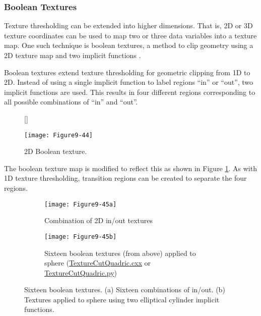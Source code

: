 \subsubsection{Boolean Textures}

Texture thresholding can be extended into higher dimensions. That is, 2D or 3D texture coordinates can be used to map two or three data variables into a texture map. One such technique is boolean textures, a method to clip geometry using a 2D texture map and two implicit functions \cite{Lorensen93}.

Boolean textures extend texture thresholding for geometric clipping from 1D to 2D. Instead of using a single implicit function to label regions ``in'' or ``out'', two implicit functions are used. This results in four different regions corresponding to all possible combinations of ``in'' and ``out''.

\begin{figure}[!htb]
	[\FBwidth]
	{\caption{2D Boolean texture.}\label{fig:Figure9-44}}
	{\texttt{[image: Figure9-44]}}
\end{figure}

The boolean texture map is modified to reflect this as shown in Figure  \ref{fig:Figure9-44}. As with 1D texture thresholding, transition regions can be created to separate the four regions.

\begin{figure}[htb]
	\begin{subfigure}[h]{0.58\linewidth}
		\texttt{[image: Figure9-45a]}
		\captionsetup{justification=centering}
		\caption{Combination of 2D in/out textures}
		\label{fig:Figure9-45a}
	\end{subfigure}
	\hfill
	\begin{subfigure}[h]{0.58\linewidth}
		\texttt{[image: Figure9-45b]}
		\captionsetup{justification=centering}
		\caption{Sixteen boolean textures (from above) applied to sphere  (\href{https://lorensen.github.io/VTKExamples/site/Cxx/Texture/TextureCutQuadric/}{TextureCutQuadric.cxx} or \href{https://lorensen.github.io/VTKExamples/site/Python/Texture/TextureCutQuadric/}{TextureCutQuadric.py})}
		\label{fig:Figure9-45b}
	\end{subfigure}
	\caption{Sixteen boolean textures. (a) Sixteen combinations of in/out. (b) Textures applied to sphere using two elliptical cylinder implicit functions.}\label{fig:Figure9-45}
\end{figure}

